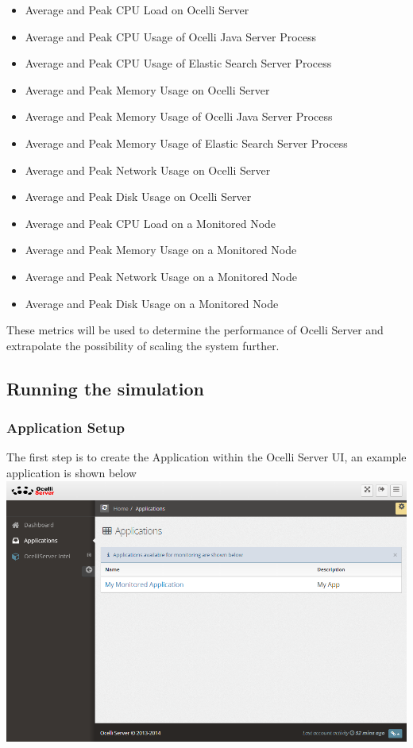 \documentclass{llncs}
\begin{document}
\begin{itemize}
\item Average and Peak CPU Load on Ocelli Server
\item Average and Peak CPU Usage of Ocelli Java Server Process
\item Average and Peak CPU Usage of Elastic Search Server Process
\item Average and Peak Memory Usage on Ocelli Server
\item Average and Peak Memory Usage of Ocelli Java Server Process
\item Average and Peak Memory Usage of Elastic Search Server Process
\item Average and Peak Network Usage on Ocelli Server
\item Average and Peak Disk Usage on Ocelli Server
\item Average and Peak CPU Load on a Monitored Node
\item Average and Peak Memory Usage on a Monitored Node
\item Average and Peak Network Usage on a Monitored Node
\item Average and Peak Disk Usage on a Monitored Node
\end{itemize}

These metrics will be used to determine the performance of Ocelli Server and extrapolate the possibility of scaling the system further.

\subsection{Running the simulation}

\subsubsection{Application Setup}
The first step is to create the Application within the Ocelli Server UI, an example application is shown below\newline\newline
\includegraphics[scale=0.5]{app1}\newline\newline
\end{document}
